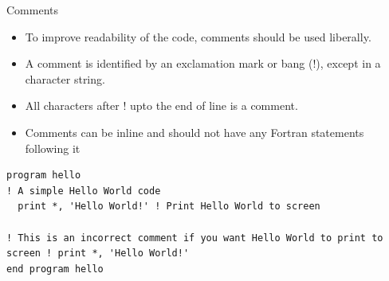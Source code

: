 \documentclass[c,mathserif,compress,xcolor=svgnames]{beamer}
\newenvironment{eblock}[0]
{
\begin{beamerboxesrounded}[upper=uppercol2,lower=lowercol2,shadow=true]}
{\end{beamerboxesrounded}}
\begin{document}
\begin{frame}[fragile]{Comments}
  \begin{itemize}
    \item To improve readability of the code, comments should be used liberally.
    \item A comment is identified by an exclamation mark or bang (!), except in a character string.
    \item All characters after ! upto the end of line is a comment.
    \item Comments can be inline and should not have any Fortran statements following it
  \end{itemize}
  \begin{eblock}{}
    \begin{lstlisting}[language={[90]Fortran}]
program hello
! A simple Hello World code
  print *, 'Hello World!' ! Print Hello World to screen

! This is an incorrect comment if you want Hello World to print to screen ! print *, 'Hello World!'
end program hello
    \end{lstlisting}
  \end{eblock}
\end{frame}
\end{document}
